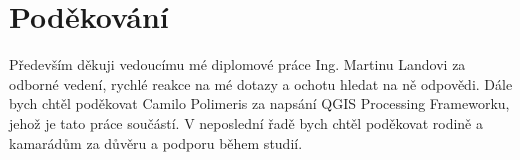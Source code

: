 \vfill

\vglue 14cm

\section*{Poděkování}
\indent\indent Především děkuji vedoucímu mé diplomové práce Ing. Martinu Landovi za
odborné vedení, rychlé reakce na mé dotazy a ochotu hledat na ně
odpovědi. Dále bych chtěl poděkovat Camilo Polimeris za napsání QGIS
Processing Frameworku, jehož je tato práce součástí. V neposlední řadě
bych chtěl poděkovat rodině a kamarádům za důvěru a podporu během
studií.
